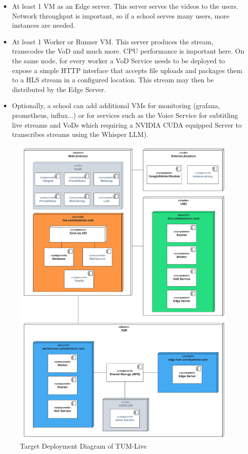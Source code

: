 \begin{itemize}
    \item At least 1 VM as an Edge server. This server serves the videos to the users. Network throughput is important, so if a school serves many users, more instances are needed.
    \item At least 1 Worker or Runner VM. This server produces the stream, transcodes the VoD and much more. CPU performance is important here. On the same node, for every worker a VoD Service needs to be deployed to expose a simple HTTP interface that accepts file uploads and packages them to a HLS stream in a configured location. This stream may then be distributed by the Edge Server.
    \item Optionally, a school can add additional VMs for monitoring (grafana, prometheus, influx...) or for services such as the Voice Service for subtitling live streams and VoDs which requiring a NVIDIA CUDA equipped Server to transcribes streams using the Whisper LLM).
\end{itemize}

\begin{figure}[htpb]
    \centering
    \includegraphics[width=\textwidth]{images/DeploymentDiagram.png}
    \caption[Target System Architecture]{Target Deployment Diagram of TUM-Live}\label{fig:system-architecture}
\end{figure}

